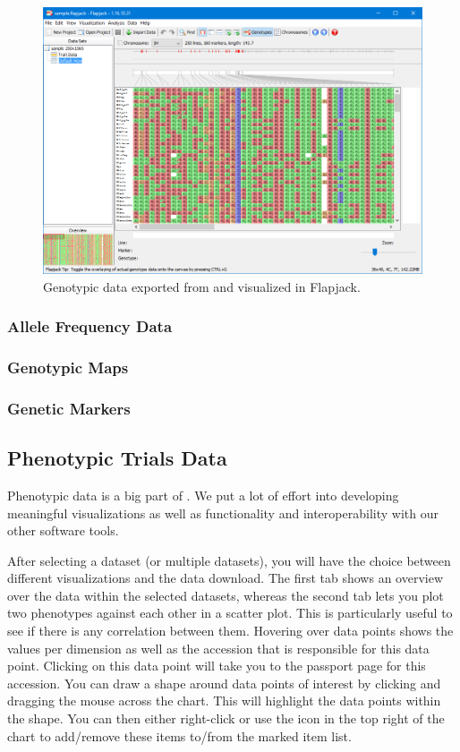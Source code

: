 \begin{figure}
	\centering
	\includegraphics[width=0.85\linewidth]{img/features/genotypic-data-flapjack.png}
	\caption{Genotypic data exported from {\germinate} and visualized in Flapjack.}
	\label{fig:features:genotypic-data-flapjack}
\end{figure}

\subsubsection{Allele Frequency Data}

\subsubsection{Genotypic Maps}
\label{sec:features:genotypic-maps}

\subsubsection{Genetic Markers}

\subsection{Phenotypic Trials Data}
Phenotypic data is a big part of {\germinate}. We put a lot of effort into developing meaningful visualizations as well as functionality and interoperability with our other software tools. 

After selecting a dataset (or multiple datasets), you will have the choice between different visualizations and the data download. The first tab shows an overview over the data within the selected datasets, whereas the second tab lets you plot two phenotypes against each other in a scatter plot. This is particularly useful to see if there is any correlation between them. Hovering over data points shows the values per dimension as well as the accession that is responsible for this data point. Clicking on this data point will take you to the passport page for this accession. You can draw a shape around data points of interest by clicking and dragging the mouse across the chart. This will highlight the data points within the shape. You can then either right-click or use the icon in the top right of the chart to add/remove these items to/from the marked item list.

